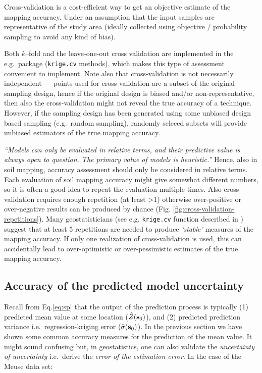 \documentclass[11pt]{krantz}
\makeatletter
\newenvironment{kframe}{%
\medskip{}
\setlength{\fboxsep}{.8em}
 \def\at@end@of@kframe{}%
 \ifinner\ifhmode%
  \def\at@end@of@kframe{\end{minipage}}%
  \begin{minipage}{\columnwidth}%
 \fi\fi%
 \def\FrameCommand##1{\hskip\@totalleftmargin \hskip-\fboxsep
 \colorbox{shadecolor}{##1}\hskip-\fboxsep
     \hskip-\linewidth \hskip-\@totalleftmargin \hskip\columnwidth}%
 \MakeFramed {\advance\hsize-\width
   \@totalleftmargin\z@ \linewidth\hsize
   \@setminipage}}%
 {\par\unskip\endMakeFramed%
 \at@end@of@kframe}
\newenvironment{rmdblock}[1]
  {
  \begin{itemize}
  \renewcommand{\labelitemi}{
    \raisebox{-.7\height}[0pt][0pt]{
      {\setkeys{Gin}{width=3em,keepaspectratio}\texttt{[image: images/\#1]}}
    }
  }
  \setlength{\fboxsep}{1em}
  \begin{kframe}
  \item
  }
  {
  \end{kframe}
  \end{itemize}
  }
\newenvironment{rmdnote}
  {\begin{rmdblock}{note}}
  {\end{rmdblock}}
\theoremstyle{definition}
\theoremstyle{definition}
\theoremstyle{definition}
\theoremstyle{remark}
\makeatother
\begin{document}
\begin{rmdnote}
Cross-validation is a cost-efficient way to get an objective estimate of
the mapping accuracy. Under an assumption that the input samples are
representative of the study area (ideally collected using objective /
probability sampling to avoid any kind of bias).
\end{rmdnote}

Both \(k\)--fold and the leave-one-out cross validation are implemented
in the e.g.~package (\texttt{krige.cv} methods), which makes this type
of assessment convenient to implement. Note also that cross-validation
is not necessarily independent --- points used for cross-validation are
a subset of the original sampling design, hence if the original design
is biased and/or non-representative, then also the cross-validation
might not reveal the true accuracy of a technique. However, if the
sampling design has been generated using some unbiased design based
sampling (e.g.~random sampling), randomly seleced subsets will provide
unbiased estimators of the true mapping accuracy.

\emph{``Models can only be evaluated in relative terms, and their
predictive value is always open to question. The primary value of models
is heuristic.''} \citep{Oreskes04021994} Hence, also in soil mapping,
accuracy assessment should only be considered in relative terms. Each
evaluation of soil mapping accuracy might give somewhat different
numbers, so it is often a good idea to repeat the evaluation multiple
times. Also cross-validation requires enough repetition (at least
\textgreater{}1) otherwise over-positive or over-negative results can be
produced by chance (Fig. \ref{fig:cross-validation-repetitions}). Many
geostatisticians (see e.g. \texttt{krige.cv} function described in
\citet[pp.222--223]{Bivand2008Springer}) suggest that at least 5
repetitions are needed to produce \emph{`stable'} measures of the
mapping accuracy. If only one realization of cross-validation is used,
this can accidentally lead to over-optimistic or over-pessimistic
estimates of the true mapping accuracy.

\hypertarget{accuracy-of-the-predicted-model-uncertainty}{%
\subsection{Accuracy of the predicted model
uncertainty}\label{accuracy-of-the-predicted-model-uncertainty}}

Recall from Eq.\eqref{eq:sp} that the output of the prediction process is
typically (1) predicted mean value at some location
(\(\hat Z({\bf{s}}_0)\)), and (2) predicted prediction variance
i.e.~regression-kriging error (\(\hat{\sigma}({\bf{s}}_0)\)). In the
previous section we have shown some common accuracy measures for the
prediction of the mean value. It might sound confusing but, in
geostatistics, one can also validate the \emph{uncertainty of
uncertainty} i.e.~derive the \emph{error of the estimation error}. In
the case of the Meuse data set:
\end{document}
